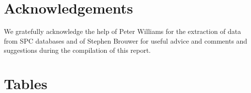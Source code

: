 \documentclass[12pt]{SCreport}
\begin{document}
\section*{Acknowledgements}
We gratefully acknowledge the help of Peter Williams for the extraction of data from SPC databases and of Stephen Brouwer for useful advice and comments and suggestions during the compilation of this report.






\appendix
\clearpage
\section{Tables}
\end{document}
